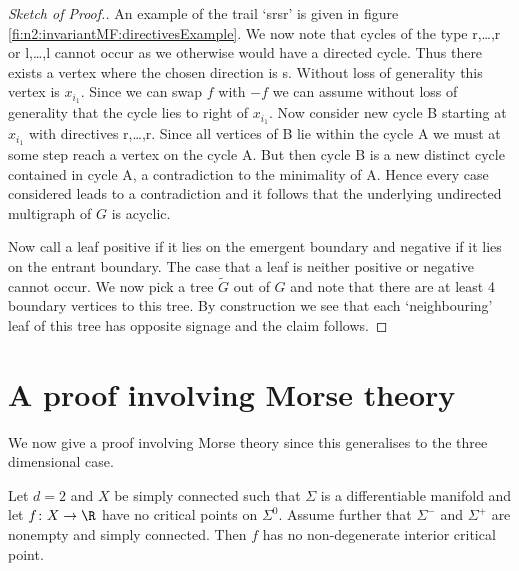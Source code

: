 \begin{proof}[Sketch of Proof.]
  An example of the trail `srsr' is given in figure \ref{fi:n2:invariantMF:directivesExample}.
  We now note that cycles of the type r,\dots,r or l,\dots,l
  cannot occur as we otherwise would have a directed cycle. Thus there exists a vertex where the chosen direction is s. 
  Without loss of generality this vertex is $x_{i_1}$.
  Since we can swap $f$ with $-f$ we can assume without loss of generality that the cycle lies to right of $x_{i_1}$.
  Now consider new cycle B starting at $x_{i_1}$ with directives r,\dots,r.
  Since all vertices of B lie within the cycle A we must at some step reach a vertex on the cycle A. But then cycle B is a new distinct cycle
  contained in cycle A, a contradiction to the minimality of A.
  Hence every case considered leads to a contradiction and it follows that the underlying undirected multigraph of $G$
  is acyclic.
  
  Now call a leaf positive if it lies on the emergent boundary and
  negative if it lies on the entrant boundary. The case that a leaf is neither positive or negative cannot occur.
  We now pick a tree $\widetilde{G}$ out of $G$ and note that
  there are at least 4 boundary vertices to this tree.
  By construction we see that each `neighbouring' leaf of this tree
  has opposite signage and the claim follows.
\end{proof}

\section{A proof involving Morse theory}


We now give a proof involving Morse theory since this generalises to the three dimensional case.
\begin{proposition}
  Let $d=2$ and $X$ be simply connected such that $\Sigma$ is a differentiable manifold and let $f\colon X\to\R$ have no critical points on $\Sigma^0$.
  Assume further that $\Sigma^-$ and $\Sigma^+$ are nonempty and simply connected. Then $f$ has no non-degenerate interior critical point.
\end{proposition}

